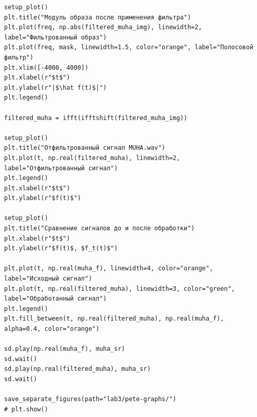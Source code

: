 \documentclass[a4paper, 12pt]{article}
\begin{document}
\begin{verbatim}
setup_plot()
plt.title("Модуль образа после применения фильтра")
plt.plot(freq, np.abs(filtered_muha_img), linewidth=2, label="Фильтрованный образ")
plt.plot(freq, mask, linewidth=1.5, color="orange", label="Полосовой фильтр")
plt.xlim([-4000, 4000])
plt.xlabel(r"$t$")
plt.ylabel(r"|$\hat f(t)$|")
plt.legend()

filtered_muha = ifft(ifftshift(filtered_muha_img))

setup_plot()
plt.title("Отфильтрованный сигнал MUHA.wav")
plt.plot(t, np.real(filtered_muha), linewidth=2, label="Отфильтрованный сигнал")
plt.legend()
plt.xlabel(r"$t$")
plt.ylabel(r"$f(t)$")

setup_plot()
plt.title("Сравнение сигналов до и после обработки")
plt.xlabel(r"$t$")
plt.ylabel(r"$f(t)$, $f_t(t)$")

plt.plot(t, np.real(muha_f), linewidth=4, color="orange", label="Исходный сигнал")
plt.plot(t, np.real(filtered_muha), linewidth=3, color="green", label="Обработанный сигнал")
plt.legend()
plt.fill_between(t, np.real(filtered_muha), np.real(muha_f), alpha=0.4, color="orange")

sd.play(np.real(muha_f), muha_sr)
sd.wait()
sd.play(np.real(filtered_muha), muha_sr)
sd.wait()

save_separate_figures(path="lab3/pete-graphs/")
# plt.show()
\end{verbatim}
\end{document}
